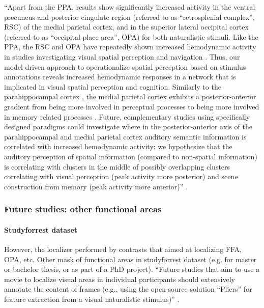 ``Apart from the PPA, results show significantly increased activity in the
ventral precuneus and posterior cingulate region (referred to as ``retrosplenial
complex'', RSC) of the medial parietal cortex, and in the superior lateral
occipital cortex (referred to as ``occipital place area'', OPA) for both
naturalistic stimuli.
Like the PPA, the RSC and OPA have repeatedly shown increased hemodynamic
activity in studies investigating visual spatial perception and navigation
\citep{chrastil2018heterogeneity, bettencourt2013role, dilks2013occipital,
epstein2019scene}.
Thus, our model-driven approach to operationalize spatial perception based on
stimulus annotations reveals increased hemodynamic responses in a network that
is implicated in visual spatial perception and cognition.
Similarly to the parahippocampal cortex \citep{aminoff2013role}, the medial
parietal cortex exhibits a posterior-anterior gradient from being more involved
in perceptual processes to being more involved in memory related processes
\citep{chrastil2018heterogeneity, hassabis2009construction, silson2019posterior,
steel2021network}.
Future, complementary studies using specifically designed paradigms could
investigate where in the posterior-anterior axis of the parahippocampal and
medial parietal cortex auditory semantic information is correlated with
increased hemodynamic activity:
we hypothesize that the auditory perception of spatial information (compared to
non-spatial information) is correlating with clusters in the middle of possibly
overlapping clusters correlating with visual perception (peak activity more
posterior) and scene construction from memory (peak activity more anterior)''
\citep{haeusler2022processing}.



\subsubsection{Future studies: other functional areas}






\paragraph{Studyforrest dataset}

%
However, the localizer performed by \citep{sengupta2016extension} contrasts
that aimed at localizing FFA, OPA, etc.
%
Other mask of functional areas in studyforrest dataset (e.g. for master or
bachelor thesis, or as part of a PhD project).
%
``Future studies that aim to use a movie to localize visual areas in individual
participants should extensively annotate the content of frames (e.g., using the
open-source solution ``Pliers''\citep{mcnamara2017developing} for feature
extraction from a visual naturalistic stimulus)''
\citep{haeusler2022processing}.


